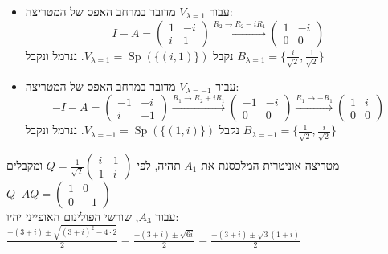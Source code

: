 \documentclass{article}
\DeclareMathOperator{\adj}{^\ast}
\DeclareMathOperator{\Sp}{Sp}
\begin{document}
\begin{itemize}
    \item עבור $V_{\lambda=1}$ מדובר במרחב האפס של המטריצה: \\
          \[
              I-A=\begin{pmatrix}
                  1 & -i \\
                  i & 1
              \end{pmatrix}\xrightarrow{R_2\rightarrow R_2-iR_1}
              \begin{pmatrix}
                  1 & -i \\
                  0 & 0
              \end{pmatrix}
          \]
          נקבל $V_{\lambda=1}=\Sp(\{ (i, 1) \})$.
          ננרמל ונקבל $B_{\lambda=1}=\{ \frac{i}{\sqrt{2}}, \frac{1}{\sqrt{2}} \}$
    \item עבור $V_{\lambda=-1}$ מדובר במרחב האפס של המטריצה: \\
          \[
              -I-A=\begin{pmatrix}
                  -1 & -i \\
                  i  & -1
              \end{pmatrix}\xrightarrow{R_1\rightarrow R_2+iR_1}
              \begin{pmatrix}
                  -1 & -i \\
                  0  & 0
              \end{pmatrix}\xrightarrow{R_1\rightarrow -R_1}
              \begin{pmatrix}
                  1 & i \\
                  0 & 0
              \end{pmatrix}
          \]
          נקבל $V_{\lambda=-1}=\Sp(\{ (1, i) \})$.
          ננרמל ונקבל $B_{\lambda=-1}=\{ \frac{1}{\sqrt{2}}, \frac{i}{\sqrt{2}} \}$
\end{itemize}
מטריצה אוניטרית המלכסנת את $A_1$ תהיה, לפי $Q=\frac{1}{\sqrt{2}}\begin{pmatrix}
        i & 1 \\
        1 & i
    \end{pmatrix}$ ומקבלים $Q\adj A Q = \begin{pmatrix}
        1 & 0  \\
        0 & -1
    \end{pmatrix}$ \\
עבור $A_3$, שורשי הפולינום האופייני יהיו: $\frac{-(3+i)\pm \sqrt{(3+i)^2-4\cdot 2}}{2}=\frac{-(3+i)\pm \sqrt{6i}}{2}=\frac{-(3+i)\pm \sqrt{3}(1+i)}{2}$ \\
\end{document}
